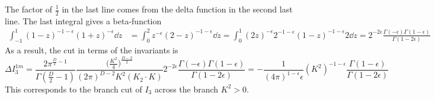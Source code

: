The factor of $\frac{1}{2}$ in the last line comes from the delta function in the second last line.
%
The last integral gives a beta-function
%
\begin{equation*}
\begin{split}
\int^1_{-1} (1-z)^{-1-\epsilon}(1+z)^{-\epsilon} \dd z & = 
\int^2_{0} z^{-\epsilon}(2-z)^{-1-\epsilon} \dd z 
=\int^1_0(2z)^{-\epsilon} 2^{-1-\epsilon} (1-z)^{-1-\epsilon} 2 \dd z
=2^{-2\epsilon}\frac{\Gamma(-\epsilon)\Gamma(1-\epsilon)}{\Gamma(1-2\epsilon)}
\end{split}
\end{equation*}
%
As a result, the cut in terms of the invariants is
\begin{equation*}
\Delta I_3^{1m} = 
\frac{2\pi^{\frac{D}{2}-1}}{\Gamma(\frac{D}{2}-1)}\frac{\big(\frac{K^2}{4}\big)^{\frac{D-2}{2}}}{(2\pi)^{D-2}K^2(K_2\cdot K)} 2^{-2\epsilon}\frac{\Gamma(-\epsilon)\Gamma(1-\epsilon)}{\Gamma(1-2\epsilon)}
=
-\frac{1}{(4\pi)^{1 - \epsilon}\epsilon}(K^{2})^{-1-\epsilon}\frac{\Gamma(1-\epsilon)}{\Gamma(1-2\epsilon)}
\end{equation*}
This corresponds to the branch cut of $I_3$ across the branch $K^2 > 0$.